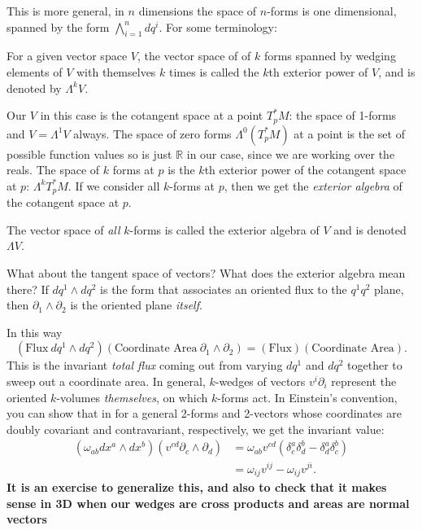	This is more general, in $n$ dimensions the space of $n$-forms is one dimensional, spanned by the form $\bigwedge_{i=1}^n dq^i$. For some terminology:
	\begin{defn} For a given vector space $V$, the vector space of of $k$ forms spanned by wedging elements of $V$ with themselves $k$ times is called the $k$th exterior power of $V$, and is denoted by $\Lambda^kV$.
	\end{defn}
	Our $V$ in this case is the cotangent space at a point $T^*_p M$: the space of 1-forms and $V = \Lambda^1 V$ always. The space of zero forms $\Lambda^0 (T^*_p M)$ at a point is the set of possible function values so is just $\mathbb R$ in our case, since we are working over the reals. The space of $k$ forms at $p$ is the $k$th exterior power of the cotangent space at $p$: $\Lambda^k T^*_p M$. If we consider all $k$-forms at $p$, then we get the \emph{exterior algebra} of the cotangent space at $p$. 
	\begin{defn}
		The vector space of \emph{all} $k$-forms is called the exterior algebra of $V$ and is denoted $\Lambda V$.
	\end{defn}
	What about the tangent space of vectors? What does the exterior algebra mean there? If $dq^1 \wedge dq^2$ is the form that associates an oriented flux to the $q^1 q^2$ plane, then $\partial_1 \wedge \partial_2$ is the oriented plane \emph{itself}.
	
	In this way 
	\begin{equation*}
		(\text{Flux} ~ dq^1 \wedge dq^2)(\text{Coordinate Area} ~ \partial_1 \wedge \partial_2) = (\text{Flux}) (\text{Coordinate Area}).
	\end{equation*} 
	This is the invariant \emph{total flux} coming out from varying $dq^1$ and $dq^2$ together to sweep out a coordinate area. In general, $k$-wedges of vectors $v^i \partial_i$ represent the oriented $k$-volumes \emph{themselves}, on which $k$-forms act. In Einstein's convention, you can show that in for a general 2-forms and 2-vectors whose coordinates are doubly covariant and contravariant, respectively, we get the invariant value:
	\begin{align*}
		(\omega_{ab} dx^a \wedge dx^b) (v^{cd} \partial_c \wedge \partial_d) &= \omega_{ab} v^{cd} (\delta^{a}_c \delta^{b}_d - \delta^{a}_d \delta^{b}_c)\\
		& = \omega_{ij}v^{ij} - \omega_{ij}v^{ji}.
	\end{align*}
	\textbf{It is an exercise to generalize this, and also to check that it makes sense in 3D when our wedges are cross products and areas are normal vectors}
	
